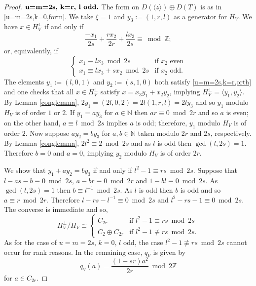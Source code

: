 \documentclass[12pt, a4paper]{article}
\newcommand{\ZZ}{\mathbb{Z}}
\newcommand{\NN}{\mathbb{N}}
\newcommand{\la}{\langle}
\newcommand{\ra}{\rangle}
\newcommand{\opn}{\operatorname}
\newcommand{\op}{\oplus}
\begin{document}
\begin{proof}
  \noindent $\textbf{u=m=2s, k=r, l \text{odd}.}$
  The form on $D(\la z \ra) \op D(T)$ is as in \eqref{u=m=2s,k=0,form}.
  We take $\xi = 1$ and $y_3:=(1,r,l)$ as a generator for $H_V$.
  We have $x \in H_V^{\perp}$ if and only if
  \begin{equation*}
    \frac{-x_1}{2s} + \frac{r x_2}{2r} + \frac{l x_3}{2s} \equiv \bmod{ \ZZ};
  \end{equation*}
  or, equivalently, if 
  \begin{equation}\label{u=m=2s,k=r,orth}
    \begin{cases}
      x_1 \equiv l x_3 \bmod{ 2s} & \text{if $x_2$ even} \\
      x_1 \equiv l x_3 + s x_2 \bmod{ 2s} & \text{if $x_2$ odd}.
    \end{cases}
  \end{equation}
  The elements $y_1:=(l,0,1)$ and $y_2:=(s,1,0)$ both satisfy \eqref{u=m=2s,k=r,orth} and one checks that all $x \in H_V^{\perp}$ satisfy $x = x_3 y_1 + x_2 y_2$, implying $H_V^{\perp} = \la y_1, y_2 \ra$.
By Lemma \ref{conglemma}, $2y_1 = (2l,0,2)=2l(1,r,l) = 2l y_3$ and so $y_1$ modulo $H_V$ is of order $1$ or $2$. 
  If $y_1 = a y_3$ for $a \in \NN$ then $ar \equiv 0 \bmod{ 2r}$ and so $a$ is even; on the other hand, $a \equiv l \bmod{ 2s}$ implies $a$ is odd; therefore, $y_1$ modulo $H_V$ is of order $2$. 
  Now suppose $a y_2 = b y_3$ for $a, b \in \NN$ taken modulo $2r$ and $2s$, respectively. 
  By Lemma \ref{conglemma}, $2l^2 \equiv 2 \bmod{ 2s}$ and as $l$ is odd then $\opn{gcd}(l, 2s)=1$.
  Therefore $b=0$ and $a=0$, implying $y_2$ modulo $H_V$ is of order $2r$.
  
  We show that $y_1 + a y_2 = b y_3$ if and only if $l^2 - 1 \equiv rs \bmod{ 2s}$.
  Suppose that 
  $l-as-b \equiv 0 \bmod{ 2s}$,
  $a-br \equiv 0 \bmod{ 2r}$ and
  $1-bl \equiv 0 \bmod{ 2s}$.
  As $\opn{gcd}(l,2s)=1$ then $b \equiv l^{-1} \bmod{ 2s}$.
  As $l$ is odd then $b$ is odd and so $a \equiv r \bmod{ 2r}$.
  Therefore $l-rs - l^{-1} \equiv 0 \bmod{2s}$ and $l^2 - rs - 1 \equiv 0 \bmod{ 2s}$.
  The converse is immediate and so, 
  \begin{equation*}
    H_V^{\perp}/H_V \cong
    \begin{cases}
      C_{2r} & \text{if $l^2 - 1 \equiv rs \bmod{ 2s}$}\\
      C_2 \op C_{2r} & \text{if $l^2 - 1 \not \equiv rs \bmod{ 2s}$}.
    \end{cases}
  \end{equation*}
  As for the case of $u=m=2s$, $k=0$, $l$ odd, the case $l^2 - 1 \not \equiv rs \bmod{ 2s}$ cannot occur for rank reasons.
  In the remaining case, $q_V$ is given by 
  \[
  q_V(a) = \frac{(1-sr)a^2}{2r} \bmod{ 2 \ZZ}
  \]
  for $a \in C_{2r}$.



\end{proof}
\end{document}
